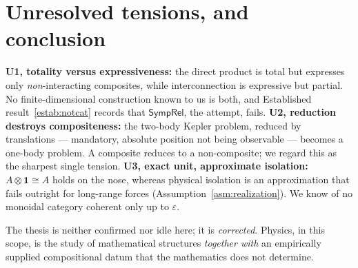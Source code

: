 \documentclass[12pt,a4paper]{article}
\theoremstyle{definition}
\theoremstyle{plain}
\theoremstyle{commentary}
\newcommand{\SympRel}{\mathsf{SympRel}}
\newcommand{\eps}{\varepsilon}
\newcommand{\pt}{\mathbf{1}}
\begin{document}
\section{Unresolved tensions, and conclusion}\label{sec:unresolved}

\textbf{U1, totality versus expressiveness:} the direct product is total but expresses only
\emph{non}-interacting composites, while interconnection is expressive but partial. No
finite-dimensional construction known to us is both, and Established result~\ref{estab:notcat}
records that $\SympRel$, the attempt, fails. \textbf{U2, reduction destroys compositeness:}
the two-body Kepler problem, reduced by translations --- mandatory, absolute position not
being observable --- becomes a one-body problem. A composite reduces to a non-composite; we
regard this as the sharpest single tension. \textbf{U3, exact unit, approximate isolation:}
$A\otimes\pt\cong A$ holds on the nose, whereas physical isolation is an approximation that
fails outright for long-range forces (Assumption~\ref{asm:realization}). We know of no
monoidal category coherent only up to $\eps$.

The thesis is neither confirmed nor idle here; it is \emph{corrected}. Physics, in this scope,
is the study of mathematical structures \emph{together with} an empirically supplied
compositional datum that the mathematics does not determine.
\end{document}
